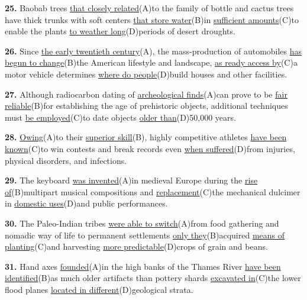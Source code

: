 \documentclass[12pt]{article}
\begin{document}
\noindent\textbf{25.} Baobab trees \uline{that closely related}(A)to the family of bottle and cactus trees have thick trunks with soft centers \uline{that store water}(B)in \uline{sufficient amounts}(C)to enable the plants \uline{to weather long}(D)periods of desert droughts.
\par
\vspace{\questionblockgap}
\noindent\textbf{26.} Since \uline{the early twentieth century}(A), the mass-production of automobiles \uline{has begun to change}(B)the American lifestyle and landscape, \uline{as ready access by}(C)a motor vehicle determines \uline{where do people}(D)build houses and other facilities.
\par
\vspace{\questionblockgap}
\noindent\textbf{27.} Although radiocarbon dating of \uline{archeological finds}(A)can prove to be \uline{fair reliable}(B)for establishing the age of prehistoric objects, additional techniques must \uline{be employed}(C)to date objects \uline{older than}(D)50,000 years.
\par
\vspace{\questionblockgap}
\noindent\textbf{28.} \uline{Owing}(A)to their \uline{superior skill}(B), highly competitive athletes \uline{have been known}(C)to win contests and break records even \uline{when suffered}(D)from injuries, physical disorders, and infections.
\par
\vspace{\questionblockgap}
\noindent\textbf{29.} The keyboard \uline{was invented}(A)in medieval Europe during the \uline{rise of}(B)multipart musical compositions and \uline{replacement}(C)the mechanical dulcimer in \uline{domestic uses}(D)and public performances.
\par
\vspace{\questionblockgap}
\noindent\textbf{30.} The Paleo-Indian tribes \uline{were able to switch}(A)from food gathering and nomadic way of life to permanent settlements \uline{only they}(B)acquired \uline{means of planting}(C)and harvesting \uline{more predictable}(D)crops of grain and beans.
\par
\vspace{\questionblockgap}
\noindent\textbf{31.} Hand axes \uline{founded}(A)in the high banks of the Thames River \uline{have been identified}(B)as much older artifacts than pottery shards \uline{excavated in}(C)the lower flood planes \uline{located in different}(D)geological strata.
\par
\vspace{\questionblockgap}
\end{document}
